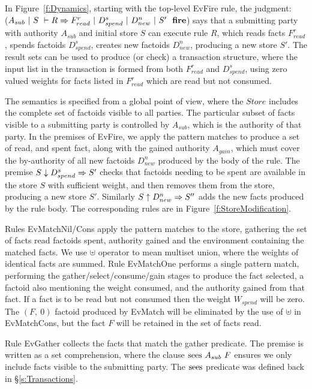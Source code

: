 In Figure~\ref{f:Dynamics}, starting with the top-level EvFire rule, the judgment: \\
($A_{sub}~|~S~\vdash R \Rightarrow F^r_{read}~|~D^s_{spend}~|~D^n_{new}~|~S'~~\textbf{fire}$) says that a submitting party with authority $A_{sub}$ and initial store $S$ can execute rule $R$, which reads facts $F^r_{read}$, spends factoids $D^s_{spend}$, creates new factoids $D^n_{new}$, producing a new store $S'$. The result sets can be used to produce (or check) a transaction structure, where the input list in the transaction is formed from both $F^r_{read}$ and $D^s_{spend}$, using zero valued weights for facts listed in $F^r_{read}$ which are read but not consumed.

The semantics is specified from a global point of view, where the $Store$ includes the complete set of factoids visible to all parties. The particular subset of facts visible to a submitting party is controlled by $A_{sub}$, which is the authority of that party. In the premises of EvFire, we apply the pattern matches to produce a set of read, and spent fact, along with the gained authority $A_{gain}$, which must cover the by-authority of all new factoids $D^n_{new}$ produced by the body of the rule. The premise $S \downarrow D^s_{spend} \Rightarrow S'$ checks that factoids needing to be spent are available in the store $S$ with sufficient weight, and then removes them from the store, producing a new store $S'$. Similarly $S \uparrow D^n_{new} \Rightarrow S''$ adds the new facts produced by the rule body. The corresponding rules are in Figure~\ref{f:StoreModification}.

Rules EvMatchNil/Cons apply the pattern matches to the store, gathering the set of facts read factoids spent, authority gained and the environment containing the matched facts. We use $\uplus$ operator to mean multiset union, where the weights of identical facts are summed. Rule EvMatchOne performs a single pattern match, performing the gather/select/consume/gain stages to produce the fact selected, a factoid also mentioning the weight consumed, and the authority gained from that fact. If a fact is to be read but not consumed then the weight $W_{spend}$ will be zero. The $(F,~ 0)$ factoid produced by EvMatch will be eliminated by the use of $\uplus$ in EvMatchCons, but the fact $F$ will be retained in the set of facts read.

Rule EvGather collects the facts that match the gather predicate. The premise is written as a set comprehension, where the clause $\textrm{sees}~ A_{sub}~ F$ ensures we only include facts visible to the submitting party. The $\textrm{sees}$ predicate was defined back in \S\ref{s:Transactions}.

